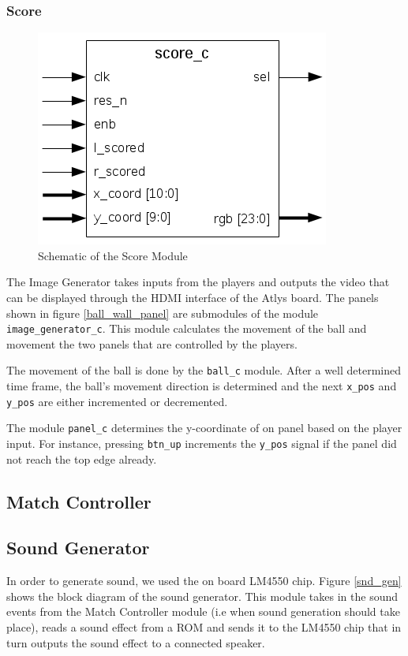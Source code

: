         \subsubsection{Score}
	        \begin{figure}[h]
		        \centering
		        \includegraphics[scale=0.7]{images/score_schematic.png}
		        \caption{Schematic of the Score Module}
		        \label{score_sch}
	        \end{figure}


        The Image Generator takes inputs from the players and outputs the video that can be displayed through the HDMI interface of the Atlys board. The panels shown in figure \ref{ball_wall_panel} are submodules of the module \texttt{image\_generator\_c}.
		This module calculates the movement of the ball and movement the two panels that are controlled by the players. 
		
		The movement of the ball is done by the \texttt{ball\_c} module.
		After a well determined time frame, the ball's movement direction is determined and the next \texttt{x\_pos} and \texttt{y\_pos} are either incremented or decremented. 
		
		The module \texttt{panel\_c} determines the y-coordinate of on panel based on the player input. For instance, pressing \texttt{btn\_up} increments the \texttt{y\_pos} signal if the panel did not reach the top edge already. 


    \subsection{Match Controller}
    
    \newpage
	  \subsection{Sound Generator}
				In order to generate sound, we used the on board LM4550 chip. Figure \ref{snd_gen} shows the block diagram of the sound generator. This module takes in the sound events from the Match Controller module (i.e when sound generation should take place), reads a sound effect from a ROM and sends it to the LM4550 chip that in turn outputs the sound effect to a connected speaker.
				
